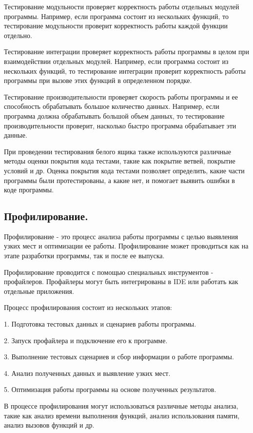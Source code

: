 \documentclass[utf8,14pt,a4paper,oneside,russian]{book}
\begin{document}
Тестирование модульности проверяет корректность работы отдельных модулей программы. Например, если программа состоит из нескольких функций, то тестирование модульности проверит корректность работы каждой функции отдельно.

Тестирование интеграции проверяет корректность работы программы в целом при взаимодействии отдельных модулей. Например, если программа состоит из нескольких функций, то тестирование интеграции проверит корректность работы программы при вызове этих функций в определенном порядке.

Тестирование производительности проверяет скорость работы программы и ее способность обрабатывать большое количество данных. Например, если программа должна обрабатывать большой объем данных, то тестирование производительности проверит, насколько быстро программа обрабатывает эти данные.

При проведении тестирования белого ящика также используются различные методы оценки покрытия кода тестами, такие как покрытие ветвей, покрытие условий и др. Оценка покрытия кода тестами позволяет определить, какие части программы были протестированы, а какие нет, и помогает выявить ошибки в коде программы.

\subsection{Профилирование.}

Профилирование - это процесс анализа работы программы с целью выявления узких мест и оптимизации ее работы. Профилирование может проводиться как на этапе разработки программы, так и после ее выпуска.

Профилирование проводится с помощью специальных инструментов - профайлеров. Профайлеры могут быть интегрированы в IDE или работать как отдельные приложения.

Процесс профилирования состоит из нескольких этапов:

1. Подготовка тестовых данных и сценариев работы программы.

2. Запуск профайлера и подключение его к программе.

3. Выполнение тестовых сценариев и сбор информации о работе программы.

4. Анализ полученных данных и выявление узких мест.

5. Оптимизация работы программы на основе полученных результатов.

В процессе профилирования могут использоваться различные методы анализа, такие как анализ времени выполнения функций, анализ использования памяти, анализ вызовов функций и др.
\end{document}

